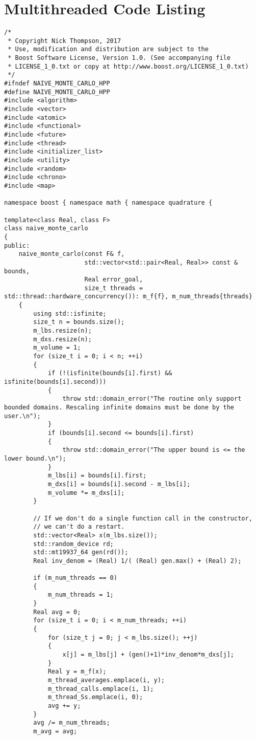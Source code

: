 \documentclass[landscape]{article}
\numberwithin{equation}{section}
\begin{document}
\section{Multithreaded Code Listing}
\begin{verbatim}
/*
 * Copyright Nick Thompson, 2017
 * Use, modification and distribution are subject to the
 * Boost Software License, Version 1.0. (See accompanying file
 * LICENSE_1_0.txt or copy at http://www.boost.org/LICENSE_1_0.txt)
 */
#ifndef NAIVE_MONTE_CARLO_HPP
#define NAIVE_MONTE_CARLO_HPP
#include <algorithm>
#include <vector>
#include <atomic>
#include <functional>
#include <future>
#include <thread>
#include <initializer_list>
#include <utility>
#include <random>
#include <chrono>
#include <map>

namespace boost { namespace math { namespace quadrature {

template<class Real, class F>
class naive_monte_carlo
{
public:
    naive_monte_carlo(const F& f,
                      std::vector<std::pair<Real, Real>> const & bounds,
                      Real error_goal,
                      size_t threads = std::thread::hardware_concurrency()): m_f{f}, m_num_threads{threads}
    {
        using std::isfinite;
        size_t n = bounds.size();
        m_lbs.resize(n);
        m_dxs.resize(n);
        m_volume = 1;
        for (size_t i = 0; i < n; ++i)
        {
            if (!(isfinite(bounds[i].first) && isfinite(bounds[i].second)))
            {
                throw std::domain_error("The routine only support bounded domains. Rescaling infinite domains must be done by the user.\n");
            }
            if (bounds[i].second <= bounds[i].first)
            {
                throw std::domain_error("The upper bound is <= the lower bound.\n");
            }
            m_lbs[i] = bounds[i].first;
            m_dxs[i] = bounds[i].second - m_lbs[i];
            m_volume *= m_dxs[i];
        }

        // If we don't do a single function call in the constructor,
        // we can't do a restart.
        std::vector<Real> x(m_lbs.size());
        std::random_device rd;
        std::mt19937_64 gen(rd());
        Real inv_denom = (Real) 1/( (Real) gen.max() + (Real) 2);

        if (m_num_threads == 0)
        {
            m_num_threads = 1;
        }
        Real avg = 0;
        for (size_t i = 0; i < m_num_threads; ++i)
        {
            for (size_t j = 0; j < m_lbs.size(); ++j)
            {
                x[j] = m_lbs[j] + (gen()+1)*inv_denom*m_dxs[j];
            }
            Real y = m_f(x);
            m_thread_averages.emplace(i, y);
            m_thread_calls.emplace(i, 1);
            m_thread_Ss.emplace(i, 0);
            avg += y;
        }
        avg /= m_num_threads;
        m_avg = avg;


\end{verbatim}
\end{document}
